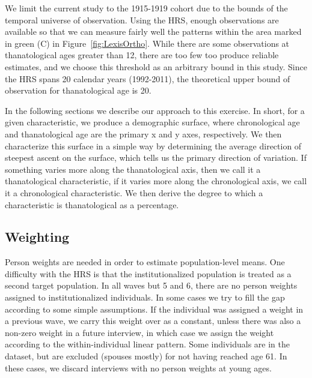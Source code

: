 \documentclass{article}
\begin{document}
We limit the current study to the 1915-1919 cohort due
to the bounds of the temporal universe of observation. Using the HRS, enough
observations are available so that we can measure fairly well the patterns
within the area marked in green (C) in Figure~\ref{fig:LexisOrtho}. While there
are some observations at thanatological ages greater than 12, there are too few
too produce reliable estimates, and we choose this threshold as an arbitrary
bound in this study. Since the HRS spans 20 calendar years (1992-2011), the
theoretical upper bound of observation for thanatological age is 20.



In the following sections we describe our approach to this exercise.
In short, for a given characteristic, we produce a demographic surface, where chronological age and thanatological age are the
primary x and y axes, respectively.
We then characterize this surface in a simple way by determining the average direction of steepest ascent on the surface,
which tells us the primary direction of variation. If something varies more along the thanatological axis, then we call it a thanatological characteristic, if it varies more along the chronological axis, we call it a chronological characteristic. We then derive the degree to which a characteristic is thanatological as a percentage.



\subsection{Weighting}
Person weights
are needed in order to estimate population-level means.
One difficulty with the HRS is that the institutionalized population is treated
as a second target population. In all waves but 5 and 6, there are no person weights
assigned to institutionalized individuals. In some cases we try to fill the gap according to some simple
assumptions. If the individual was assigned a weight in a previous wave, we
carry this weight over as a constant, unless there was also a non-zero weight in a future interview, in
which case we assign the weight according to the within-individual linear
pattern. Some individuals are in the dataset, but are
excluded (spouses mostly) for not having reached age 61. In these
cases, we discard interviews with no person weights at young ages. 
\end{document}
